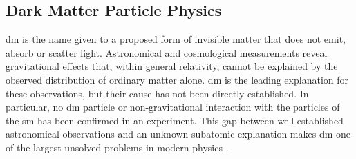 
\subsection{Dark Matter Particle Physics}
\label{sec:dm_particle_physics}



\Gls{dm} is the name given to a proposed form of invisible matter that does not
emit, absorb or scatter light. Astronomical and cosmological measurements reveal
gravitational effects that, within general relativity, cannot be explained by the
observed distribution of ordinary matter alone. \gls{dm} is the leading
explanation for these observations, but their cause has not been directly
established. In particular, no \gls{dm} particle or non-gravitational interaction
with the particles of the \gls{sm} has been confirmed in an experiment. This gap
between well-established astronomical observations and an unknown subatomic
explanation makes \gls{dm} one of the largest unsolved problems in modern
physics \cite{bertone2016-history-dark-matter,cirelli2026-darkmatter}.


